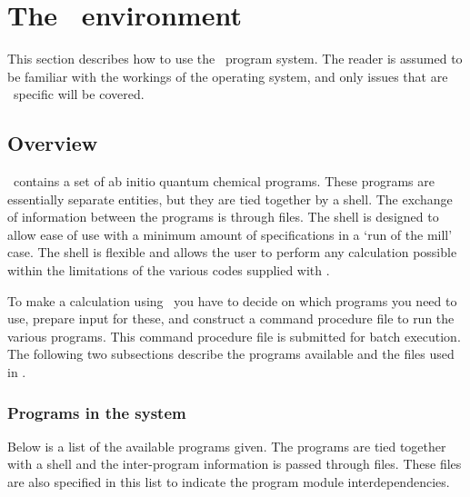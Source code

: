 \chapter{The \molcas\ environment}
This section describes how to use the \molcas\ program system. The
reader is assumed to be familiar with the workings of the operating
system, and only issues that are \molcas\ specific will be covered.

\section{Overview}

\molcas\ contains a set of ab initio quantum chemical programs. These
programs are essentially separate entities, but they are tied
together by a shell. The exchange of information between the programs
is through files. The shell is designed to allow ease of use with a
\hbox{minimum} amount of specifications in a `run of the mill' case. The
shell is flexible and allows the user to perform any calculation
possible within the limitations of the various codes supplied with
\molcas.

To make a calculation using \molcas\ you have to decide on which
programs you need to use, prepare input for these, and construct a
command procedure file to run the various programs. This command
procedure file is submitted for batch execution. The following two
subsections describe the programs available and the files used in
\molcas.

\subsection{Programs in the system}
\label{UG:sec:progs_list}
Below is a list of the available programs given. The programs are tied
together with a shell and the inter-{}program information is passed
through files. These files are also specified in this list to indicate
the program module interdependencies.


